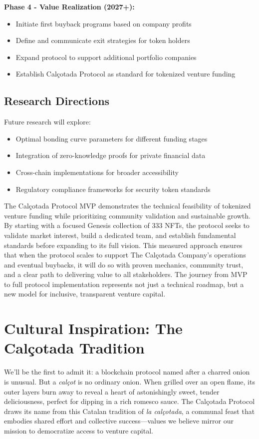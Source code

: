 \documentclass[conference]{IEEEtran}
\begin{document}
\textbf{Phase 4 - Value Realization (2027+):}
\begin{itemize}
    \item Initiate first buyback programs based on company profits
    \item Define and communicate exit strategies for token holders
    \item Expand protocol to support additional portfolio companies
    \item Establish Calçotada Protocol as standard for tokenized venture funding
\end{itemize}

\subsection{Research Directions}

Future research will explore:
\begin{itemize}
    \item Optimal bonding curve parameters for different funding stages
    \item Integration of zero-knowledge proofs for private financial data
    \item Cross-chain implementations for broader accessibility
    \item Regulatory compliance frameworks for security token standards
\end{itemize}

The Calçotada Protocol MVP demonstrates the technical feasibility of tokenized venture funding while prioritizing community validation and sustainable growth. By starting with a focused Genesis collection of 333 NFTs, the protocol seeks to validate market interest, build a dedicated team, and establish fundamental standards before expanding to its full vision. This measured approach ensures that when the protocol scales to support The Calçotada Company's operations and eventual buybacks, it will do so with proven mechanics, community trust, and a clear path to delivering value to all stakeholders. The journey from MVP to full protocol implementation represents not just a technical roadmap, but a new model for inclusive, transparent venture capital.


\appendix
\section{Cultural Inspiration: The Calçotada Tradition}

We'll be the first to admit it: a blockchain protocol named after a charred onion is unusual. But a \textit{calçot} is no ordinary onion. When grilled over an open flame, its outer layers burn away to reveal a heart of astonishingly sweet, tender deliciousness, perfect for dipping in a rich romesco sauce. The Calçotada Protocol draws its name from this Catalan tradition of \textit{la calçotada}, a communal feast that embodies shared effort and collective success—values we believe mirror our mission to democratize access to venture capital.
\end{document}
